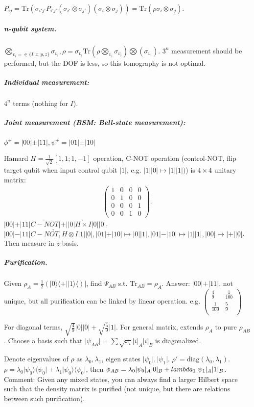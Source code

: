 \documentclass{article}
\newcommand{\Tr}{\mathrm{Tr}}
\newcommand{\ket}[1]{\vert #1\vert}
\newcommand{\ketbra}[2]{\vert #1\rangle \langle #2\vert}
\begin{document}
\begin{spacing}{1.2}
$P_{ij} = \Tr(\sigma_{i'j'}P_{i'j'}(\sigma_{i'}\otimes\sigma_{j'})(\sigma_i\otimes\sigma_j)) = \Tr(\rho\sigma_i\otimes\sigma_j)$.

\subparagraph{n-qubit system.}
$\bigotimes_{v_i=\in\{I,x,y,z\}} \sigma_{v_i}, \rho = \sigma_{v_i}\Tr(\rho\bigotimes_{v_i}\sigma_{v_i})\bigotimes(\sigma_{v_i}).$
$3^n$ measurement should be performed, but the DOF is less, so this tomography is not optimal. 

\subparagraph{Individual measurement:} $4^n$ terms (nothing for $I$).
\subparagraph{Joint measurement (BSM: Bell-state measurement):} $\phi^{\pm} = \ket{00}\pm\ket{11}, \psi^{\pm} = \ket{01}\pm\ket{10}$

Hamard $H = \frac{1}{\sqrt2}[1, 1; 1, -1]$ operation, C-NOT operation (control-NOT, flip target qubit when input control qubit $\ket{1}$, e.g. $\ket{1}\ket{0}\mapsto\ket{1}\ket{1})$) is $4\times 4$ unitary matrix:
\begin{gather*}
\left(\begin{array}{cccc}
1&0&0&0\\
0&1&0&0\\
0&0&0&1\\
0&0&1&0
\end{array}\right).
\end{gather*}
$\ket{00}+\ket{11}\underrightarrow{C-NOT}\ket{+}\ket{0} \underrightarrow{H\times I} \ket{0}\ket{0}$, $\ket{00}-\ket{11}\underrightarrow{C-NOT, H\otimes I} \ket{1}\ket{0}, \ket{01}+\ket{10}\mapsto \ket{0}\ket{1}, \ket{01}-\ket{10}\mapsto \ket{1}\ket{1}, \ket{00}\mapsto\ket{+}\ket{0}$. Then measure in $z$-basis.

\subparagraph{Purification.} Given $\rho_A = \frac{1}{2}(\ketbra{0}+\ketbra{1})$, find $\Psi_{AB}$ s.t. $\Tr_{AB} = \rho_A$. Answer: $\ket{00}+\ket{11}$, not unique, but all purification can be linked by linear operation. e.g.
$ \left(\begin{array}{cc}
\frac49 &\frac{1}{100}\\
\frac{1}{100}&\frac59\\
\end{array}\right)$

For diagonal terms, $\sqrt{\frac49}\ket{0}\ket{0}+\sqrt{\frac59}\ket{1}$. For general matrix, extends $\rho_A$ to pure $\rho_{AB}$.
Choose a basis such that $\ket{\psi_{AB}} = \sum \sqrt{x_i}\ket{i}_A\ket{i}_B$ is diagonalized.

Denote eigenvalues of $\rho$ as $\lambda_0,\lambda_1$, eigen states $\ket{\psi_0}, \ket{\psi_1}$. $\rho' = \mathrm{diag}(\lambda_0,\lambda_1)$. $\rho = \lambda_0\ketbra{\psi_0}{\psi_0}+\lambda_1\ketbra{\psi_0}{\psi_0}$, then $\phi_{AB} = \lambda_0\ket{\psi_0}_A\ket{0}_B+\\lambda_1\ket{\psi_1}_A\ket{1}_B$. Comment: Given any mixed states, you can always find a larger Hilbert space such that the density matrix is purified (not unique, but there are relations between such purification).



\end{spacing}
\end{document}
